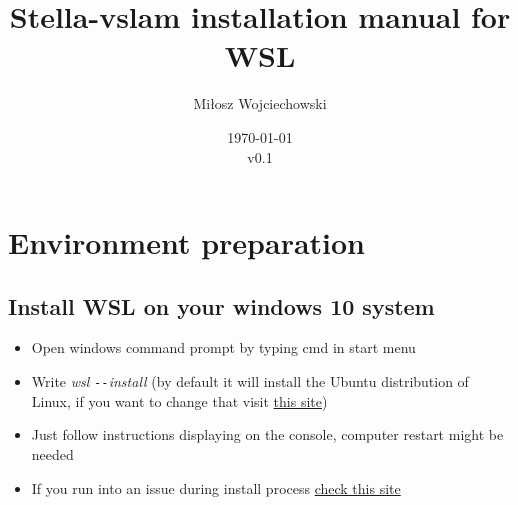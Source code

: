 \documentclass[a4paper,12pt]{book}
\begin{document}
	
\author{Miłosz Wojciechowski}
\title{Stella-vslam installation manual for WSL}
\date{\today\\ v0.1}


\maketitle
{}
\tableofcontents

\mainmatter
\chapter{Environment preparation}
\section{Install WSL on your windows 10 system}
\begin{itemize}
	\item Open windows command prompt by typing cmd in start menu
	\item Write \textit{wsl \texttt{-{}-}install} (by default it will install the Ubuntu distribution of Linux, if you want to change that visit \href{https://learn.microsoft.com/en-us/windows/wsl/basic-commands#install}{this site})
	\item Just follow instructions displaying on the console, computer restart might be needed
	\item If you run into an issue during install process \href{https://learn.microsoft.com/en-us/windows/wsl/troubleshooting#installation-issues}{check this site}
\end{itemize}
\end{document}
